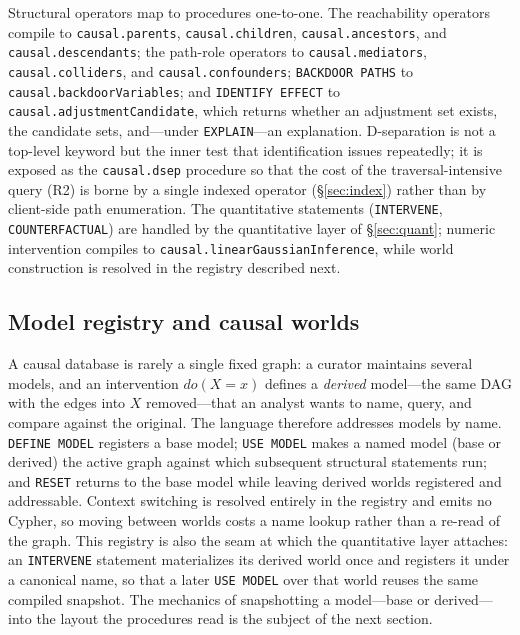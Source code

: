 Structural operators map to procedures one-to-one. The reachability operators
compile to \texttt{causal.parents}, \texttt{causal.children},
\texttt{causal.ancestors}, and \texttt{causal.descendants}; the path-role
operators to \texttt{causal.mediators}, \texttt{causal.colliders}, and
\texttt{causal.confounders}; \lstinline[style=causaldsl]|BACKDOOR PATHS| to
\texttt{causal.backdoorVariables}; and \lstinline[style=causaldsl]|IDENTIFY EFFECT|
to \texttt{causal.adjustmentCandidate}, which returns whether an adjustment set
exists, the candidate sets, and---under \lstinline[style=causaldsl]|EXPLAIN|---an
explanation. D-separation is not a top-level keyword but the inner test that
identification issues repeatedly; it is exposed as the \texttt{causal.dsep}
procedure so that the cost of the traversal-intensive query (R2) is borne by a
single indexed operator (\S\ref{sec:index}) rather than by client-side path
enumeration. The quantitative statements (\lstinline[style=causaldsl]|INTERVENE|,
\lstinline[style=causaldsl]|COUNTERFACTUAL|) are handled by the quantitative
layer of \S\ref{sec:quant}; numeric intervention compiles to
\texttt{causal.linearGaussianInference}, while world construction is resolved in
the registry described next.

\subsection{Model registry and causal worlds}\label{sec:lang:registry}

A causal database is rarely a single fixed graph: a curator maintains several
models, and an intervention $do(X{=}x)$ defines a \emph{derived} model---the same
DAG with the edges into $X$ removed---that an analyst wants to name, query, and
compare against the original. The language therefore addresses models by name.
\lstinline[style=causaldsl]|DEFINE MODEL| registers a base model;
\lstinline[style=causaldsl]|USE MODEL| makes a named model (base or derived) the
active graph against which subsequent structural statements run; and
\lstinline[style=causaldsl]|RESET| returns to the base model while leaving derived
worlds registered and addressable. Context switching is resolved entirely in the
registry and emits no Cypher, so moving between worlds costs a name lookup rather
than a re-read of the graph. This registry is also the seam at which the
quantitative layer attaches: an \lstinline[style=causaldsl]|INTERVENE| statement
materializes its derived world once and registers it under a canonical name, so
that a later \lstinline[style=causaldsl]|USE MODEL| over that world reuses the
same compiled snapshot. The mechanics of snapshotting a model---base or
derived---into the layout the procedures read is the subject of the next section.
